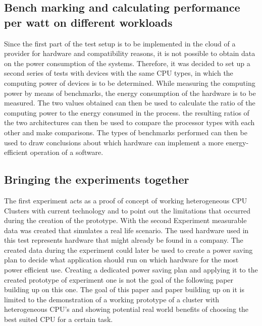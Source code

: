\subsection{Bench marking and calculating performance per watt on different workloads}
Since the first part of the test setup is to be implemented in the cloud of a provider for hardware and compatibility reasons, it is not possible to obtain data on the power consumption of the systems. Therefore, it was decided to set up a second series of tests with devices with the same CPU types, in which the computing power of devices is to be determined. While measuring the computing power by means of benchmarks, the energy consumption of the hardware is to be measured. The two values obtained can then be used to calculate the ratio of the computing power to the energy consumed in the process. the resulting ratios of the two architectures can then be used to compare the processor types with each other and make comparisons. The types of benchmarks performed can then be used to draw conclusions about which hardware can implement a more energy-efficient operation of a software.

\subsection{Bringing the experiments together}
The first experiment acts as a proof of concept of working heterogeneous CPU Clusters with current technology and to point out the limitations that occurred during the creation of the prototype. With the second Experiment measurable data was created that simulates a real life scenario. The used hardware used in this test represents hardware that might already be found  in a company. The created data during the experiment could later be used to create a power saving plan to decide what application should run on which hardware for the most power efficient use.
Creating a dedicated power saving plan and applying it to the created prototype of experiment one is not the goal of the following paper building up on this one. The goal of this paper and paper building up on it is limited to the demonstration of a working prototype of a cluster with heterogeneous CPU's and showing potential real world benefits of choosing the best suited CPU for a certain task.
